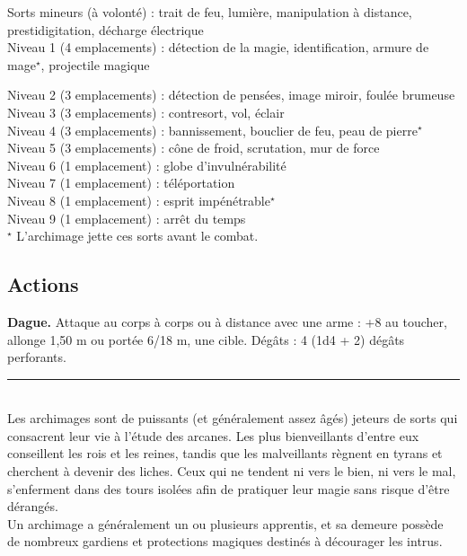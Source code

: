 \begin{figure*}[hb!]
{\begin{minipage}[c]{.45\linewidth}
Sorts mineurs (à volonté) : trait de feu, lumière, manipulation à distance, prestidigitation, décharge électrique \\
Niveau 1 (4 emplacements) : détection de la magie, identification, armure de mage$^\star$, projectile magique 
  \end{minipage}
  \hspace{4pt}
  \begin{minipage}[c]{.45\linewidth}
Niveau 2 (3 emplacements) : détection de pensées, image miroir, foulée brumeuse \\
Niveau 3 (3 emplacements) : contresort, vol, éclair \\
Niveau 4 (3 emplacements) : bannissement, bouclier de feu, peau de pierre$^\star$ \\
Niveau 5 (3 emplacements) : cône de froid, scrutation, mur de force \\
Niveau 6 (1 emplacement) : globe d'invulnérabilité \\
Niveau 7 (1 emplacement) : téléportation \\
Niveau 8 (1 emplacement) : esprit impénétrable$^\star$ \\
Niveau 9 (1 emplacement) : arrêt du temps \\
$^\star$ L'archimage jette ces sorts avant le combat. \\
\vspace{-10pt}
    \subsection*{Actions}
    {\bfseries Dague.} Attaque au corps à corps ou à distance avec une arme : +8 au toucher, allonge 1,50 m ou portée 6/18 m, une cible. Dégâts : 4 (1d4 + 2) dégâts perforants. \\
    \noindent\rule{\textwidth}{1pt} \\
Les archimages sont de puissants (et généralement assez âgés) jeteurs de sorts qui consacrent leur vie à l'étude des arcanes. Les plus bienveillants d'entre eux conseillent les rois et les reines, tandis que les malveillants règnent en tyrans et cherchent à devenir des liches. Ceux qui ne tendent ni vers le bien, ni vers le mal, s'enferment dans des tours isolées afin de pratiquer leur magie sans risque d'être dérangés. \\
Un archimage a généralement un ou plusieurs apprentis, et sa demeure possède de nombreux gardiens et protections magiques destinés à décourager les intrus.
  \end{minipage}
}%
\end{figure*}


